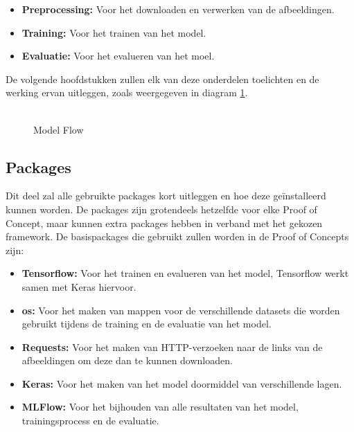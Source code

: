 \begin{itemize}
    \item \textbf{Preprocessing:} Voor het downloaden en verwerken van de afbeeldingen.
    \item \textbf{Training:} Voor het trainen van het model.
    \item \textbf{Evaluatie:} Voor het evalueren van het moel.
\end{itemize}

De volgende hoofdstukken zullen elk van deze onderdelen toelichten en de werking ervan uitleggen, zoals weergegeven in diagram \ref{fig:Model_Flow}.
\begin{figure}[htbp]
    \includegraphics[width=0.9]{graphics/Model_Diagram.PNG}
    \caption{Model Flow}
    \label{fig:Model_Flow}
\end{figure}
\subsection{Packages}
Dit deel zal alle gebruikte packages kort uitleggen en hoe deze geïnstalleerd kunnen worden. De packages zijn grotendeels hetzelfde voor elke Proof of Concept, maar kunnen extra packages hebben in verband met het gekozen framework.
De basispackages die gebruikt zullen worden in de Proof of Concepts zijn:
\begin{itemize}
    \item \textbf{Tensorflow:} Voor het trainen en evalueren van het model, Tensorflow werkt samen met Keras hiervoor.
    \item \textbf{os:} Voor het maken van mappen voor de verschillende datasets die worden gebruikt tijdens de training en de evaluatie van het model.
    \item \textbf{Requests:} Voor het maken van HTTP-verzoeken naar de links van de afbeeldingen om deze dan te kunnen downloaden.
    \item \textbf{Keras:} Voor het maken van het model doormiddel van verschillende lagen.
    \item \textbf{MLFlow:} Voor het bijhouden van alle resultaten van het model, trainingsprocess en de evaluatie.
\end{itemize}

